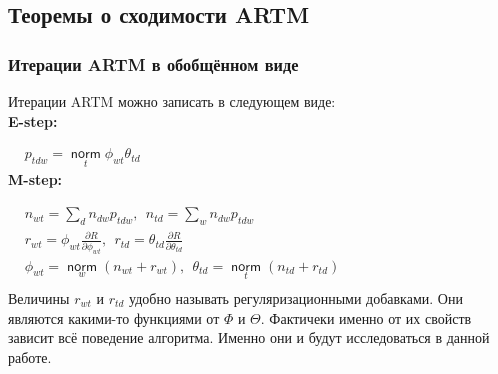 \documentclass[12pt]{article}
\newcommand{\norm}{\mathop{\mathsf{norm}}\limits}
\begin{document}
	\subsection{Теоремы о сходимости ARTM }
	\subsubsection{Итерации ARTM в обобщённом виде}	  
Итерации ARTM можно записать в следующем виде: \\
\textbf{E-step:}   
 
$
\begin{aligned}
& p_{tdw} = \norm_t \phi_{wt} \theta_{td}
\end{aligned}
$\medskip\\
\textbf{M-step:}

$
\begin{aligned}    
& n_{wt} = \sum\limits_{d} n_{dw} p_{tdw},~~n_{td} = \sum\limits_{w} n_{dw} p_{tdw}\\    
& r_{wt} =  \phi_{wt}\frac{\partial R}{\partial\phi_{wt}},~~ r_{td} =  \theta_{td}\frac{\partial R}{\partial\theta_{td}}\\
& \phi_{wt}  = \norm_w \left(n_{wt} + r_{wt} \right),~~\theta_{td} = \norm_t  \left(n_{td} + r_{td}\right)\\
\end{aligned}
$\medskip\\
Величины $r_{wt}$ и $r_{td}$ удобно называть регуляризационными добавками. Они являются какими-то функциями от $\Phi$ и $\Theta$. Фактичеки именно от их свойств зависит всё поведение алгоритма. Именно они и будут исследоваться в данной работе.
\end{document}
